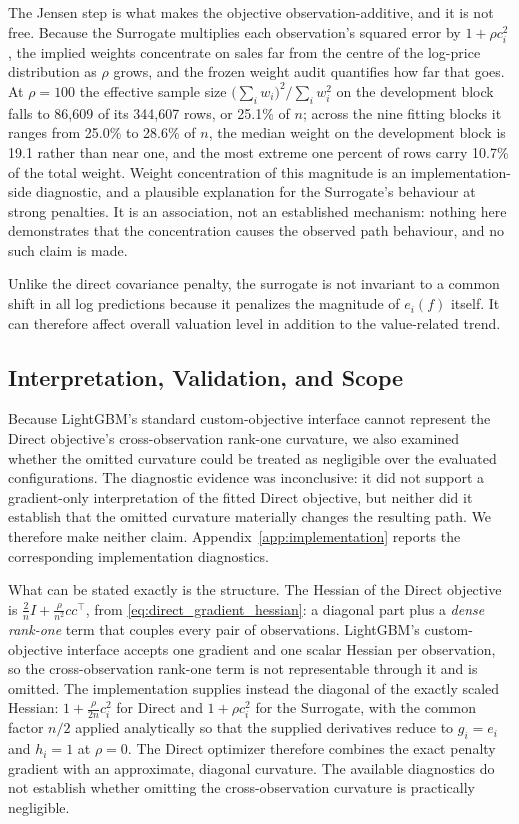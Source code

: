 \documentclass[10pt]{article}
\theoremstyle{definition}
\newcommand{\1}{\mathbf{1}}
\begin{document}
The Jensen step is what makes the objective observation-additive, and it is not
free. Because the Surrogate multiplies each observation's squared error by
$1+\rho c_i^{2}$, the implied weights concentrate on sales far from the centre of the
log-price distribution as $\rho$ grows, and the frozen weight audit quantifies how far
that goes. At $\rho=100$ the effective sample size
$\bigl(\sum_i w_i\bigr)^{2}/\sum_i w_i^{2}$ on the development block falls to 86,609 of
its 344,607 rows, or 25.1\% of $n$; across the nine fitting blocks it ranges from 25.0\%
to 28.6\% of $n$, the median weight on the development block is 19.1 rather than near
one, and the most extreme one percent of rows carry 10.7\% of the total weight. Weight
concentration of this magnitude is an implementation-side diagnostic, and a plausible
explanation for the Surrogate's behaviour at strong penalties. It is an association, not
an established mechanism: nothing here demonstrates that the concentration causes the
observed path behaviour, and no such claim is made.


{Unlike the direct covariance penalty, the surrogate is not invariant to a common shift in all log predictions because it penalizes the magnitude of $e_i(f)$ itself. It can therefore affect
overall valuation level in addition to the value-related trend.
}


\subsection{{Interpretation, Validation, and Scope}}
\label{subsec:correction_scope}


Because LightGBM's standard custom-objective interface cannot represent the Direct
objective's cross-observation rank-one curvature, we also examined whether the omitted
curvature could be treated as negligible over the evaluated configurations. The diagnostic
evidence was inconclusive: it did not support a gradient-only interpretation of the fitted
Direct objective, but neither did it establish that the omitted curvature materially changes
the resulting path. We therefore make neither claim. Appendix~\ref{app:implementation}
reports the corresponding implementation diagnostics.

What can be stated exactly is the structure. The Hessian of the Direct objective is
$\frac{2}{n}I+\frac{\rho}{n^{2}}cc^{\top}$, from
\eqref{eq:direct_gradient_hessian}: a diagonal part plus a \emph{dense rank-one} term
that couples every pair of observations. LightGBM's custom-objective interface accepts
one gradient and one scalar Hessian per observation, so the cross-observation rank-one
term is not representable through it and is omitted. The implementation supplies instead
the diagonal of the exactly scaled Hessian:
$1+\frac{\rho}{2n}c_i^{2}$ for Direct and $1+\rho c_i^{2}$ for the Surrogate, with the
common factor $n/2$ applied analytically so that the supplied derivatives reduce to
$g_i=e_i$ and $h_i=1$ at $\rho=0$. The Direct optimizer therefore combines the exact
penalty gradient with an approximate, diagonal curvature. The available diagnostics do
not establish whether omitting the cross-observation curvature is practically negligible.
\end{document}
